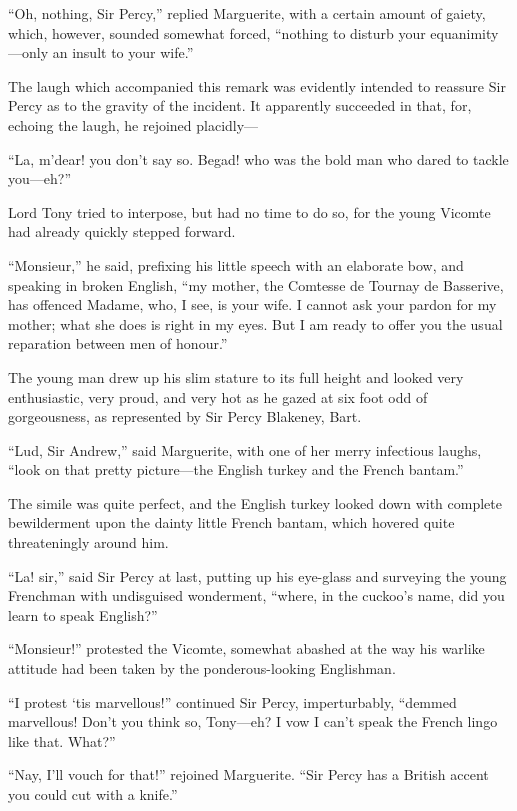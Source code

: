 \documentclass[paper=a5,BCOR=7mm,twoside,DIV=calc,12pt,usegeometry,chapterprefix,endperiod,headings=big]{scrbook}
\begin{document}
\enquote{Oh, nothing, Sir Percy,} replied Marguerite, with a certain amount of gaiety, which, however, sounded somewhat forced, \enquote{nothing to disturb your equanimity---only an insult to your wife.}

The laugh which accompanied this remark was evidently intended to reassure Sir Percy as to the gravity of the incident. It apparently succeeded in that, for, echoing the laugh, he rejoined placidly---

\enquote{La, m'dear! you don't say so. Begad! who was the bold man who dared to tackle you---eh?}

Lord Tony tried to interpose, but had no time to do so, for the young Vicomte had already quickly stepped forward.

\enquote{Monsieur,} he said, prefixing his little speech with an elaborate bow, and speaking in broken English, \enquote{my mother, the Comtesse de Tournay de Basserive, has offenced Madame, who, I see, is your wife. I cannot ask your pardon for my mother; what she does is right in my eyes. But I am ready to offer you the usual reparation between men of honour.}

The young man drew up his slim stature to its full height and looked very enthusiastic, very proud, and very hot as he gazed at six foot odd of gorgeousness, as represented by Sir Percy Blakeney, Bart.

\enquote{Lud, Sir Andrew,} said Marguerite, with one of her merry infectious laughs, \enquote{look on that pretty picture---the English turkey and the French bantam.}

The simile was quite perfect, and the English turkey looked down with complete bewilderment upon the dainty little French bantam, which hovered quite threateningly around him.

\enquote{La! sir,} said Sir Percy at last, putting up his eye-glass and surveying the young Frenchman with undisguised wonderment, \enquote{where, in the cuckoo's name, did you learn to speak English?}

\enquote{Monsieur!} protested the Vicomte, somewhat abashed at the way his warlike attitude had been taken by the ponderous-looking Englishman.

\enquote{I protest `tis marvellous!} continued Sir Percy, imperturbably, \enquote{demmed marvellous! Don't you think so, Tony---eh? I vow I can't speak the French lingo like that. What?}

\enquote{Nay, I'll vouch for that!} rejoined Marguerite. \enquote{Sir Percy has a British accent you could cut with a knife.}
\end{document}
